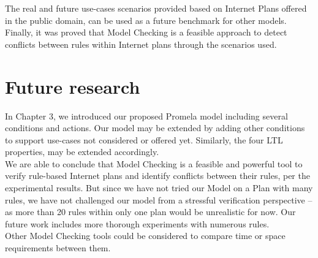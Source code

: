 The real and future use-cases scenarios provided based on Internet Plans offered in the public domain, can be used as a future benchmark for other models. \\

Finally, it was proved that Model Checking is a feasible approach to detect conflicts between rules within Internet plans through the scenarios used. \\

\section{Future research}
\noindent
In Chapter 3, we introduced our proposed Promela model including several conditions and actions. Our model may be extended by adding other conditions to support use-cases not considered or offered yet. Similarly, the four LTL properties, may be extended accordingly. \\

We are able to conclude that Model Checking is a feasible and powerful tool to verify rule-based Internet plans and identify conflicts between their rules, per the experimental results. But since we have not tried our Model on a Plan with many rules, we have not challenged our model from a stressful verification perspective -- as more than 20 rules within only one plan would be unrealistic for now. Our future work includes more thorough experiments with numerous rules. \\

Other Model Checking tools could be considered to compare time or space requirements between them. \\

\clearpage
\noindent